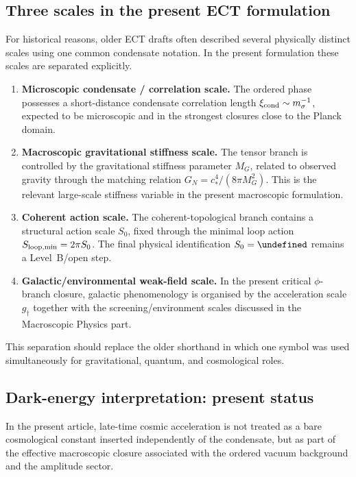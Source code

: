 \documentclass[11pt,a4paper]{article}
\let\hbar\undefined
\numberwithin{equation}{section}
\begin{document}
\subsection{Three scales in the present ECT formulation}
\label{app:cosmo:scales}

For historical reasons, older ECT drafts often described several
physically distinct scales using one common condensate notation.
In the present formulation these scales are separated explicitly.

\begin{enumerate}
  \item \textbf{Microscopic condensate / correlation scale.}
  The ordered phase possesses a short-distance condensate correlation
  length $\xi_{\rm cond}\sim m_\sigma^{-1}$,
  expected to be microscopic and in the strongest closures close to the
  Planck domain.

  \item \textbf{Macroscopic gravitational stiffness scale.}
  The tensor branch is controlled by the gravitational stiffness
  parameter $M_G$, related to observed gravity through the matching
  relation $G_N=c_*^4/(8\pi M_G^2)$.
  This is the relevant large-scale stiffness variable in the present
  macroscopic formulation.

  \item \textbf{Coherent action scale.}
  The coherent-topological branch contains a structural action scale
  $S_0$, fixed through the minimal loop action $S_{\rm loop,min}=2\pi S_0$.
  The final physical identification $S_0=\hbar$ remains a Level~B/open
  step.

  \item \textbf{Galactic/environmental weak-field scale.}
  In the present critical $\phi$-branch closure, galactic phenomenology
  is organised by the acceleration scale $g_\dagger$ together with the
  screening/environment scales discussed in the Macroscopic Physics part.
\end{enumerate}

This separation should replace the older shorthand in which one symbol
was used simultaneously for gravitational, quantum, and cosmological
roles.


\subsection{Dark-energy interpretation: present status}
\label{app:cosmo:de}

In the present article, late-time cosmic acceleration is not treated as
a bare cosmological constant inserted independently of the condensate,
but as part of the effective macroscopic closure associated with the
ordered vacuum background and the amplitude sector.
\end{document}

